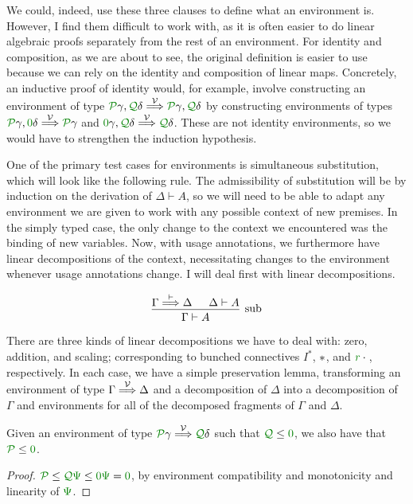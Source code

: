 We could, indeed, use these three clauses to define what an environment is.
However, I find them difficult to work with, as it is often easier to do
linear algebraic proofs separately from the rest of an environment.
For identity and composition, as we are about to see, the original definition
is easier to use because we can rely on the identity and composition of linear
maps.
Concretely, an inductive proof of identity would, for example, involve
constructing an environment of type
$\grP\gamma, \grQ\delta \env\V \grP\gamma, \grQ\delta$ by constructing
environments of types $\grP\gamma, \gr0\delta \env\V \grP\gamma$ and
$\gr0\gamma, \grQ\delta \env\V \grQ\delta$.
These are not identity environments, so we would have to strengthen the
induction hypothesis.

One of the primary test cases for environments is simultaneous substitution,
which will look like the following rule.
The admissibility of substitution will be by induction on the derivation of
$\Delta \vdash A$, so we will need to be able to adapt any environment we are
given to work with any possible context of new premises.
In the simply typed case, the only change to the context we encountered was the
binding of new variables.
Now, with usage annotations, we furthermore have linear decompositions of the
context, necessitating changes to the environment whenever usage annotations
change.
I will deal first with linear decompositions.

\begin{displaymath}
  \begin{prooftree}
    \hypo{\Gamma \env{\vdash} \Delta}
    \hypo{\Delta \vdash A}
    \infer2[sub]{\Gamma \vdash A}
  \end{prooftree}
\end{displaymath}

There are three kinds of linear decompositions we have to deal with: zero,
addition, and scaling; corresponding to bunched connectives $I^*$, $\mathbin{*}$, and
$\gr r \cdot {}$, respectively.
In each case, we have a simple preservation lemma, transforming an environment
of type $\Gamma \stackrel{\mathcal V}\Longrightarrow \Delta$ and a decomposition of $\Delta$ into a
decomposition of $\Gamma$ and environments for all of the decomposed fragments
of $\Gamma$ and $\Delta$.

\begin{lemma}\label{thm:lr-env-zero}
  Given an environment of type $\grP\gamma \env\V \grQ\delta$ such that
  $\grQ \leq \gr 0$, we also have that $\grP \leq \gr 0$.
\end{lemma}
\begin{proof}
  $\grP \leq \grQ\gr\Psi \leq \gr0\gr\Psi = \gr0$, by environment
  compatibility and monotonicity and linearity of $\gr\Psi$.
\end{proof}

